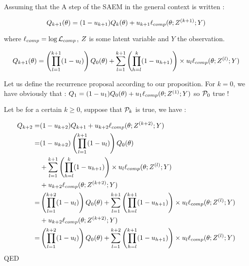 \documentclass[a4paper]{article}
\renewcommand{\varobs}{Y}
\begin{document}
\begin{myText}
Assuming that the A step of the SAEM in the general context is written : 

$$Q_{k+1} (\theta) = (1-u_{k+1})Q_k (\theta) + u_{k+1} \logcomp(\theta; \varlat[^{(k+1)}];\varobs)$$

where $\ell_{comp} = \log\mathcal L_{comp}$, $Z$ is some latent variable and $\varobs$ the observation.


\begin{prop}
    $$Q_{k+1} (\theta) = \left(\pro l1{k+1} (1-u_l)\right)Q_0 (\theta) + \som l1{k+1} \left(\pro hlk (1-u_{h+1})\right) \times u_l \logcomp(\theta; \varlat[^{(l)}];\varobs)$$
\end{prop}

\begin{dem}
    Let us define the recurrence proposal according to our proposition. For $k=0$, we have obviously that : $Q_1 = (1-u_1)Q_0(\theta) + u_1 \logcomp(\theta; \varlat[^{(1)}];\varobs) $ so $\mathcal P_0$ true !

    Let be for a certain $k\geq 0$, suppose that $\mathcal P_k$ is true, we have :

    \begin{align*}
        Q_{k+2} 
        =& (1-u_{k+2}) Q_{k+1} + u_{k+2} \logcomp(\theta; \varlat[^{(k+2)}];\varobs)
        \\
        =& (1-u_{k+2}) \left( \pro l1{k+1} (1-u_l)\right)Q_0 (\theta)
         \\ & + \som l1{k+1} \left(\pro hlk (1-u_{h+1})\right) \times u_l \logcomp(\theta; \varlat[^{(l)}];\varobs)
         \\ & + u_{k+2}\logcomp(\theta; \varlat[^{(k+2)}];\varobs)  
        \\
        =& \left( \pro l1{k+2} (1-u_l)\right)Q_0 (\theta)
              + \som l1{k+1} \left(\pro hl{k+1} (1-u_{h+1})\right) \times u_l \logcomp(\theta; \varlat[^{(l)}];\varobs)
         \\ & + u_{k+2}\logcomp(\theta; \varlat[^{(k+2)}];\varobs)  
        \\
        =& \left( \pro l1{k+2} (1-u_l)\right)Q_0 (\theta)
            + \som l1{k+2} \left(\pro hl{k+1} (1-u_{h+1})\right) \times u_l \logcomp(\theta; \varlat[^{(l)}];\varobs)
    \end{align*}
    QED
\end{dem}


\end{myText}
\end{document}
